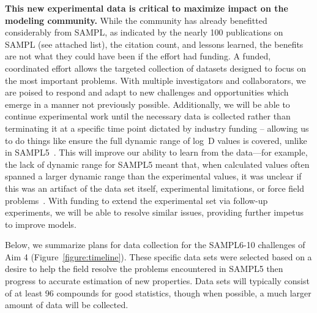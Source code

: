 \documentclass[11pt]{article}
\begin{document}
\textbf{This new experimental data is critical to maximize impact on the modeling community.} 
While the community has already benefitted considerably from SAMPL, as indicated by the nearly 100 publications on SAMPL (see attached list), the citation count, and lessons learned, the benefits are not what they could have been if the effort had funding.
A funded, coordinated effort allows the targeted collection of datasets designed to focus on the most important problems. 
With multiple investigators and collaborators, we are poised to respond and adapt to new challenges and opportunities which emerge in a manner not previously possible.
Additionally, we will be able to continue experimental work until the necessary data is collected rather than terminating it at a specific time point dictated by industry funding -- allowing us to do things like ensure the full dynamic range of log~D values is covered, unlike in SAMPL5~\cite{rustenburg_measuring_2016, bannan_blind_2016}.
This will improve our ability to learn from the data---for example, the lack of dynamic range for SAMPL5 meant that, when calculated values often spanned a larger dynamic range than the experimental values, it was unclear if this was an artifact of the data set itself, experimental limitations, or force field problems~\cite{rustenburg_measuring_2016, bannan_blind_2016, paranahewage_predicting_2016, klamt_prediction_2016}. 
With funding to extend the experimental set via follow-up experiments, we will be able to resolve similar issues, providing further impetus to improve models.


Below, we summarize plans for data collection for the SAMPL6-10 challenges of Aim 4 (Figure~\ref{figure:timeline}).
These specific data sets were selected based on a desire to help the field resolve the problems encountered in SAMPL5 then progress to accurate estimation of new properties.
Data sets will typically consist of at least 96 compounds for good statistics, though when possible, a much larger amount of data will be collected.
\end{document}
